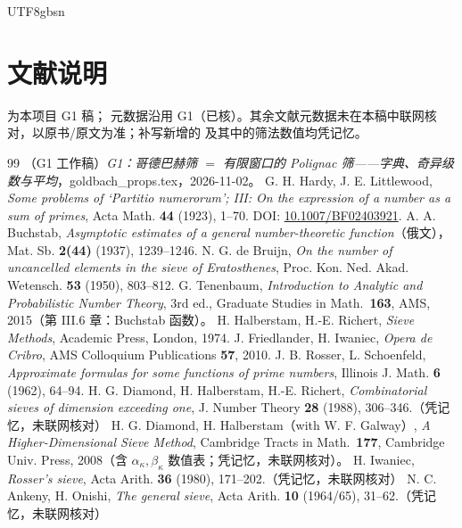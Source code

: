 \documentclass[11pt,a4paper]{article}
\theoremstyle{plain}
\theoremstyle{definition}
\begin{document}
\begin{CJK}{UTF8}{gbsn}
\section*{文献说明}
\cite{G1} 为本项目 G1 稿；\cite{HL23} 元数据沿用 G1（已核）。其余文献元数据未在本稿中联网核对，以原书/原文为准；补写新增的 \cite{DHR88,DH08,Iwa80,AO65} 及其中的筛法数值均凭记忆。

\begin{thebibliography}{99}
 （G1 工作稿）\emph{G1：哥德巴赫筛 $=$ 有限窗口的 Polignac 筛——字典、奇异级数与平均}，goldbach\_props.tex，2026-11-02。
 G. H. Hardy, J. E. Littlewood, \emph{Some problems of `Partitio numerorum'; III: On the expression of a number as a sum of primes},
Acta Math. \textbf{44} (1923), 1--70. DOI: \url{10.1007/BF02403921}.
 A. A. Buchstab, \emph{Asymptotic estimates of a general number-theoretic function}（俄文），Mat. Sb. \textbf{2(44)} (1937), 1239--1246.
 N. G. de Bruijn, \emph{On the number of uncancelled elements in the sieve of Eratosthenes},
Proc. Kon. Ned. Akad. Wetensch. \textbf{53} (1950), 803--812.
 G. Tenenbaum, \emph{Introduction to Analytic and Probabilistic Number Theory}, 3rd ed., Graduate Studies in Math.\ \textbf{163}, AMS, 2015（第 III.6 章：Buchstab 函数）。
 H. Halberstam, H.-E. Richert, \emph{Sieve Methods}, Academic Press, London, 1974.
 J. Friedlander, H. Iwaniec, \emph{Opera de Cribro}, AMS Colloquium Publications \textbf{57}, 2010.
 J. B. Rosser, L. Schoenfeld, \emph{Approximate formulas for some functions of prime numbers}, Illinois J. Math. \textbf{6} (1962), 64--94.
 H. G. Diamond, H. Halberstam, H.-E. Richert, \emph{Combinatorial sieves of dimension exceeding one}, J. Number Theory \textbf{28} (1988), 306--346.（凭记忆，未联网核对）
 H. G. Diamond, H. Halberstam（with W. F. Galway）, \emph{A Higher-Dimensional Sieve Method}, Cambridge Tracts in Math.\ \textbf{177}, Cambridge Univ. Press, 2008（含 $\alpha_\kappa,\beta_\kappa$ 数值表；凭记忆，未联网核对）。
 H. Iwaniec, \emph{Rosser's sieve}, Acta Arith. \textbf{36} (1980), 171--202.（凭记忆，未联网核对）
 N. C. Ankeny, H. Onishi, \emph{The general sieve}, Acta Arith. \textbf{10} (1964/65), 31--62.（凭记忆，未联网核对）
\end{thebibliography}

\end{CJK}
\end{document}
